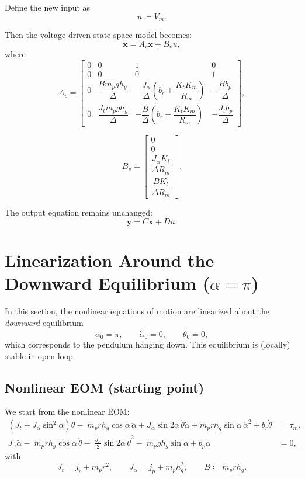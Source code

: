 \documentclass[12pt,a4paper]{article}
\begin{document}
Define the new input as
\[
u \coloneqq V_m.
\]

Then the voltage-driven state-space model becomes:
\[
\boxed{
\dot{\bm x}
=
A_v \bm x
+
B_v u,
}
\]
where
\[
A_v =
\begin{bmatrix}
0 & 0 & 1 & 0\\
0 & 0 & 0 & 1\\
0 & \dfrac{B m_p g h_g}{\Delta}
& -\dfrac{J_\alpha}{\Delta}\!\left(b_r+\dfrac{K_t K_m}{R_m}\right)
& -\dfrac{B b_p}{\Delta}\\
0 & \dfrac{J_t m_p g h_g}{\Delta}
& -\dfrac{B}{\Delta}\!\left(b_r+\dfrac{K_t K_m}{R_m}\right)
& -\dfrac{J_t b_p}{\Delta}
\end{bmatrix},
\]

\[
B_v =
\begin{bmatrix}
0\\
0\\
\dfrac{J_\alpha K_t}{\Delta R_m}\\
\dfrac{B K_t}{\Delta R_m}
\end{bmatrix}.
\]

The output equation remains unchanged:
\[
\boxed{
\bm y = C\bm x + D u.
}
\]


\section{Linearization Around the Downward Equilibrium ($\alpha=\pi$)}

In this section, the nonlinear equations of motion are linearized about the \emph{downward} equilibrium
\[
\alpha_0=\pi,\qquad \dot\alpha_0=0,\qquad \dot\theta_0=0,
\]
which corresponds to the pendulum hanging down. This equilibrium is (locally) stable in open-loop.

\subsection{Nonlinear EOM (starting point)}

We start from the nonlinear EOM:
\begin{align}
\left(J_t+J_\alpha\sin^2\alpha\right)\ddot\theta
-\;m_p r h_g\cos\alpha\,\ddot\alpha
+J_\alpha\sin 2\alpha\,\dot\theta\dot\alpha
+m_p r h_g\sin\alpha\,\dot\alpha^2
+b_r\dot\theta
&=
\tau_m,
\label{eq:eom_theta_nl_pi}\\[6pt]
J_\alpha\ddot\alpha
-\;m_p r h_g\cos\alpha\,\ddot\theta
-\;\frac{J_\alpha}{2}\sin 2\alpha\,\dot\theta^2
-\;m_p g h_g\sin\alpha
+b_p\dot\alpha
&=
0,
\label{eq:eom_alpha_nl_pi}
\end{align}
with
\[
J_t=j_r+m_p r^2,\qquad J_\alpha=j_p+m_p h_g^2,\qquad B\coloneqq m_p r h_g.
\]
\end{document}
